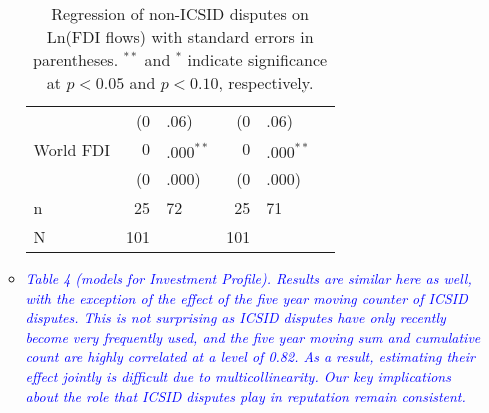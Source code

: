 \begin{enumerate}
\begin{itemize}
\begin{table}[ht]
\begin{tabular}{lr@{} lr@{}lr@{}}
			   & (0&.06) & (0&.06) \\ 
			  World FDI & $0$&$.000^{\ast\ast}$ & $0$&$.000^{\ast\ast}$ \\ 
			   & (0&.000) & (0&.000) \\    
			   \hline
			n & 25&72 & 25&71 \\ 
			  N & 101 && 101 \\ 
			   \hline
			\hline
			\end{tabular}
			\endgroup
			\caption{Regression of non-ICSID disputes on Ln(FDI flows) with standard errors in parentheses. $^{**}$ and $^{*}$ indicate significance at $p< 0.05 $ and $p< 0.10 $, respectively.} 
			\end{table}			
			\FloatBarrier

		\clearpage
		\item \textcolor{blue}{ \emph{ Table 4 (models for Investment Profile). Results are similar here as well, with the exception of the effect of the five year moving counter of ICSID disputes. This is not surprising as ICSID disputes have only recently become very frequently used, and the five year moving sum and cumulative count are highly correlated at a level of 0.82. As a result, estimating their effect jointly is difficult due to multicollinearity. Our key implications about the role that ICSID disputes play in reputation remain consistent.}}


\end{itemize}
\end{enumerate}
